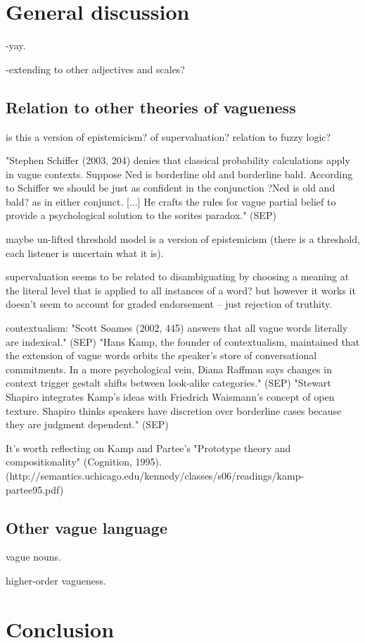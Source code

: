 \documentclass[11pt]{amsart}
\begin{document}
\section{General discussion}
\label{gd}

  -yay. 
  
  -extending to other adjectives and scales?
  
 \subsection{Relation to other theories of vagueness}
  
is this a version of epistemicism? of supervaluation? relation to fuzzy logic?

"Stephen Schiffer (2003, 204) denies that classical probability calculations apply in vague contexts. Suppose Ned is borderline old and borderline bald. According to Schiffer we should be just as confident in the conjunction ?Ned is old and bald? as in either conjunct. [...] He crafts the rules for vague partial belief to provide a psychological solution to the sorites paradox." (SEP)
  
 maybe un-lifted threshold model is a version of epistemicism (there is a threshold, each listener is uncertain what it is).
 
supervaluation seems to be related to disambiguating by choosing a meaning at the literal level that is applied to all instances of a word? but however it works it doesn't seem to account for graded endorsement -- just rejection of truthity.

contextualism: "Scott Soames (2002, 445) answers that all vague words literally are indexical." (SEP)
"Hans Kamp, the founder of contextualism, maintained that the extension of vague words orbits the speaker's store of conversational commitments. In a more psychological vein, Diana Raffman says changes in context trigger gestalt shifts between look-alike categories." (SEP)
"Stewart Shapiro integrates Kamp's ideas with Friedrich Waismann's concept of open texture. Shapiro thinks speakers have discretion over borderline cases because they are judgment dependent." (SEP)

It's worth reflecting on Kamp and Partee's "Prototype theory and compositionality" (Cognition, 1995). (http://semantics.uchicago.edu/kennedy/classes/s06/readings/kamp-partee95.pdf)
  
\subsection{Other vague language}

vague nouns. 

higher-order vagueness.

\section{Conclusion}
\end{document}
